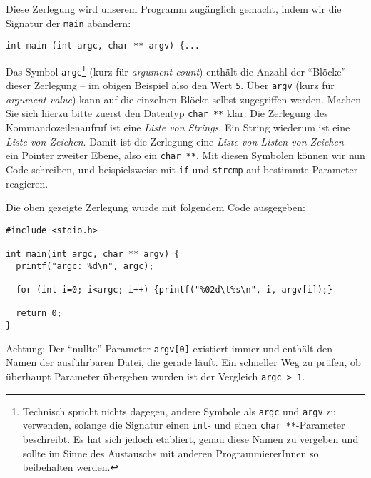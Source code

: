 Diese Zerlegung wird unserem Programm zugänglich gemacht, indem wir die Signatur der \texttt{main} abändern:
\begin{codebox}
\begin{verbatim}
int main (int argc, char ** argv) {...
\end{verbatim}
\end{codebox}

Das Symbol \texttt{argc}\footnote{Technisch spricht nichts dagegen, andere Symbole als \texttt{argc} und \texttt{argv} zu verwenden, solange die Signatur einen \texttt{int}- und einen \texttt{char **}-Parameter beschreibt. Es hat sich jedoch etabliert, genau diese Namen zu vergeben und sollte im Sinne des Austauschs mit anderen ProgrammiererInnen so beibehalten werden.} (kurz für \emph{argument count}) enthält die Anzahl der \enquote{Blöcke} dieser Zerlegung -- im obigen Beispiel also den Wert \texttt{5}. Über \texttt{argv} (kurz für \emph{argument value}) kann auf die einzelnen Blöcke selbst zugegriffen werden. Machen Sie sich hierzu bitte zuerst den Datentyp \texttt{char **} klar: Die Zerlegung des Kommandozeilenaufruf ist eine \emph{Liste von Strings}. Ein String wiederum ist eine \emph{Liste von Zeichen}. Damit ist die Zerlegung eine \emph{Liste von Listen von Zeichen} -- ein Pointer zweiter Ebene, also ein \texttt{char **}. Mit diesen Symbolen können wir nun Code schreiben, und beispielsweise mit \texttt{if} und \texttt{strcmp} auf bestimmte Parameter reagieren.

Die oben gezeigte Zerlegung wurde mit folgendem Code ausgegeben:
\begin{codebox}
\begin{verbatim}
#include <stdio.h>

int main(int argc, char ** argv) {
  printf("argc: %d\n", argc);
  
  for (int i=0; i<argc; i++) {printf("%02d\t%s\n", i, argv[i]);}
  
  return 0;
}
\end{verbatim}
\end{codebox}

\begin{hintbox}
Achtung: Der \enquote{nullte} Parameter \texttt{argv[0]} existiert immer und enthält den Namen der ausführbaren Datei, die gerade läuft.
Ein schneller Weg zu prüfen, ob überhaupt Parameter übergeben wurden ist der Vergleich \texttt{argc > 1}.
\end{hintbox}

